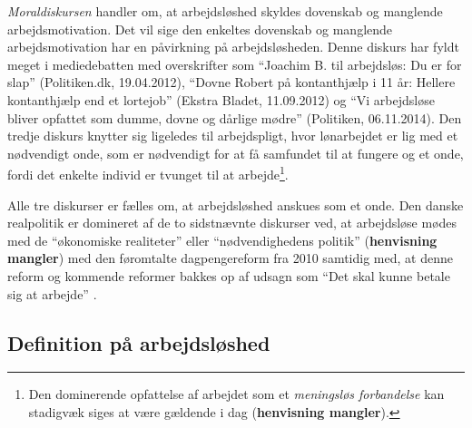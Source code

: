 \textit{Moraldiskursen} handler om, at arbejdsløshed skyldes dovenskab og manglende arbejdsmotivation. Det vil sige den enkeltes dovenskab og manglende arbejdsmotivation har en påvirkning på arbejdsløsheden. Denne diskurs har fyldt meget i mediedebatten med overskrifter som “Joachim B. til arbejdsløs: Du er for slap” (Politiken.dk, 19.04.2012), “Dovne Robert på kontanthjælp i 11 år: Hellere kontanthjælp end et lortejob” (Ekstra Bladet, 11.09.2012) og “Vi arbejdsløse bliver opfattet som dumme, dovne og dårlige mødre” (Politiken, 06.11.2014).
Den tredje diskurs knytter sig ligeledes til arbejdspligt, hvor lønarbejdet er lig med et nødvendigt onde, som er nødvendigt for at få samfundet til at fungere og et onde, fordi det enkelte individ er tvunget til at arbejde\footnote{Den dominerende opfattelse af arbejdet som et \textit{meningsløs forbandelse} \parencite[13]{Svendsen2008} kan stadigvæk siges at være gældende i dag (\textbf{henvisning mangler}).}.


Alle tre diskurser er fælles om, at arbejdsløshed anskues som et onde. Den danske realpolitik er domineret af de to sidstnævnte diskurser ved, at arbejdsløse mødes med de “økonomiske realiteter” eller “nødvendighedens politik” (\textbf{henvisning mangler}) med den føromtalte dagpengereform fra 2010 samtidig med, at denne reform og kommende reformer bakkes op af udsagn som “Det skal kunne betale sig at arbejde” \parencite{Stoejberg2015}. %



\subsection{Definition på arbejdsløshed}

